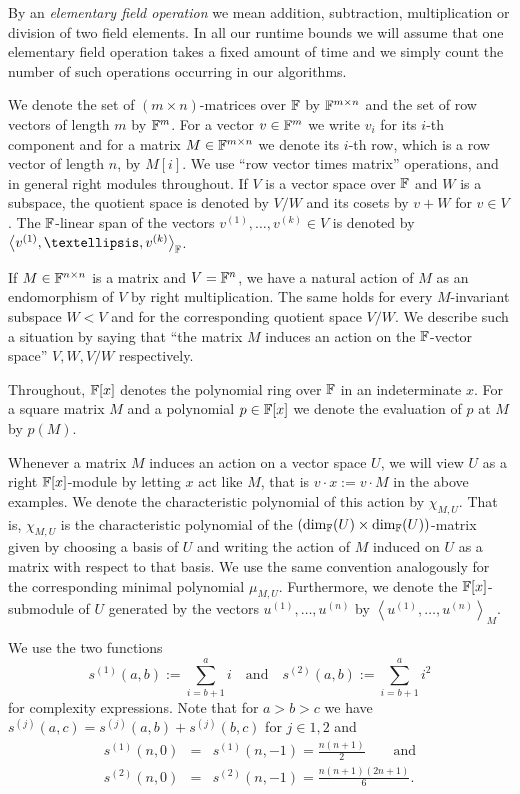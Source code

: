 By an \emph{elementary field operation} 
we mean addition, subtraction, multiplication or division of two field 
elements.
In all our runtime bounds we will assume that one elementary
field operation takes a fixed amount of time and we simply count
the number of such operations occurring in our algorithms.

We denote the set of $(m \times n)$-matrices over $\mathbb{F}$ by $\mathbb{F}^{m \times n}$
and the set of row vectors of length $m$ by $\mathbb{F}^m$. For a vector
$v \in \mathbb{F}^m$ we write $v_i$ for its $i$-th component and for a matrix 
$M \in \mathbb{F}^{m \times n}$ we denote its $i$-th row, which is
a row vector of length $n$, by $M[i]$. We use ``row vector
times matrix'' operations, and in general right modules throughout.
If $V$ is a vector space over $\mathbb{F}$ and $W$ is a subspace, the
quotient space is denoted by $V/W$ and its cosets by
$v+W$ for $v \in V$. The $\mathbb{F}$-linear span of the vectors
$v^{(1)}, \ldots, v^{(k)} \in V$ is denoted by 
$\left< v^{(1)}, \ldots, v^{(k)}\right>_\F$.

If $M \in \mathbb{F}^{n \times n}$ is a matrix and $V = \mathbb{F}^n$, we have a
natural action of $M$ as an endomorphism of $V$ by right multiplication.
The same holds for every $M$-invariant subspace $W < V$ and for
the corresponding quotient space $V/W$. We describe such a situation
by saying that ``the matrix $M$ induces an action on the $\mathbb{F}$-vector space''
$V, W, V/W$ respectively.

Throughout, $\mathbb{F}[x]$ denotes
the polynomial ring over $\mathbb{F}$ in an indeterminate $x$. For a square matrix $M$ and
a polynomial $p \in \mathbb{F}[x]$ we denote the evaluation of $p$ at $M$
by $p(M)$.

Whenever a matrix $M$ induces an action on a vector space $U$, we
will view $U$ as a right $\mathbb{F}[x]$-module by letting $x$ act like $M$,
that is $v \cdot x := v\cdot M$ in the above examples. We denote the
characteristic polynomial of this action by $\chi_{M,U}$. That is,
$\chi_{M,U}$ is the characteristic polynomial 
of the $(\dim_{\mathbb{F}}(U) \times \dim_{\mathbb{F}}(U))$-matrix given by choosing 
a basis of $U$ and writing the
action of $M$ induced on $U$ as a matrix with respect to that basis.
We use the same convention analogously for the corresponding minimal
polynomial $\mu_{M,U}$. Furthermore, we denote the $\mathbb{F}[x]$-submodule of
$U$ generated by the vectors $u^{(1)}, \ldots, u^{(n)}$ by $\left< u^{(1)}, \ldots,
u^{(n)} \right>_M$.

We use the two functions 
\begin{equation}\label{si}
s^{(1)}(a,b) := \sum_{i=b+1}^a i\quad \mbox{and}\quad
s^{(2)}(a,b) := \sum_{i=b+1}^a i^2
\end{equation}
for complexity expressions.
Note that for $a > b > c$ we have $s^{(j)}(a,c) = s^{(j)}(a,b) + s^{(j)}(b,c)$
for $j \in {1,2}$ and 
\begin{eqnarray}
\label{formels1}
s^{(1)}(n,0) &=& s^{(1)}(n,-1) = \frac{n(n+1)}{2}
\qquad\mbox{and} \\
\label{formels2}
s^{(2)}(n,0) &=& s^{(2)}(n,-1) = \frac{n(n+1)(2n+1)}{6}.
\end{eqnarray}

